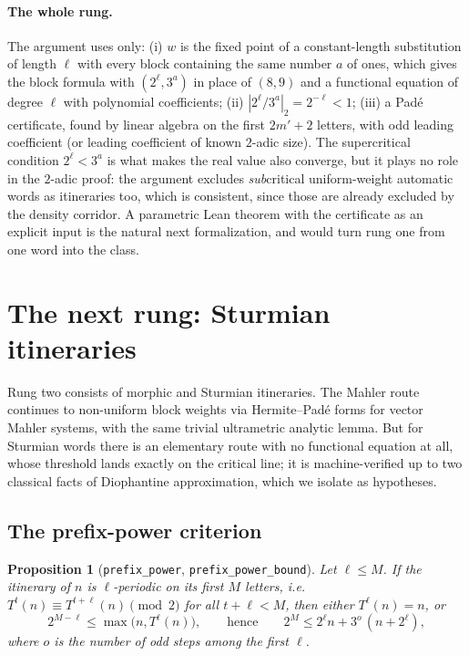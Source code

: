 \documentclass[11pt]{article}
\newtheorem{proposition}[theorem]{Proposition}
\theoremstyle{definition}
\newcommand{\code}[1]{\texttt{#1}}
\begin{document}
\paragraph{The whole rung.} The argument uses only: (i) $w$ is the
fixed point of a constant-length substitution of length $\ell$ with
every block containing the same number $a$ of ones, which gives the
block formula with $(2^\ell, 3^a)$ in place of $(8, 9)$ and a
functional equation of degree $\ell$ with polynomial coefficients;
(ii) $|2^\ell/3^a|_2 = 2^{-\ell} < 1$; (iii) a Pad\'e certificate,
found by linear algebra on the first $2m'+2$ letters, with odd leading
coefficient (or leading coefficient of known $2$-adic size). The
supercritical condition $2^\ell < 3^a$ is what makes the real value
also converge, but it plays no role in the $2$-adic proof: the
argument excludes \emph{sub}critical uniform-weight automatic words as
itineraries too, which is consistent, since those are already excluded
by the density corridor. A parametric Lean theorem with the
certificate as an explicit input is the natural next formalization,
and would turn rung one from one word into the class.

\section{The next rung: Sturmian itineraries}\label{sec:next}

Rung two consists of morphic and Sturmian itineraries. The Mahler route
continues to non-uniform block weights via Hermite--Pad\'e forms for
vector Mahler systems, with the same trivial ultrametric analytic
lemma. But for Sturmian words there is an elementary route with no
functional equation at all, whose threshold lands exactly on the
critical line; it is machine-verified up to two classical facts of
Diophantine approximation, which we isolate as hypotheses.

\subsection{The prefix-power criterion}

\begin{proposition}[\code{prefix\_power}, \code{prefix\_power\_bound}]
\label{prop:pp}
Let $\ell \le M$. If the itinerary of $n$ is $\ell$-periodic on its
first $M$ letters, i.e.\ $T^t(n) \equiv T^{t+\ell}(n) \pmod 2$ for all
$t + \ell < M$, then either $T^\ell(n) = n$, or
\[
2^{M-\ell} \le \max\big(n, T^\ell(n)\big), \qquad\text{hence}\qquad
2^M \le 2^\ell n + 3^{o}\,(n + 2^\ell),
\]
where $o$ is the number of odd steps among the first $\ell$.
\end{proposition}
\end{document}
